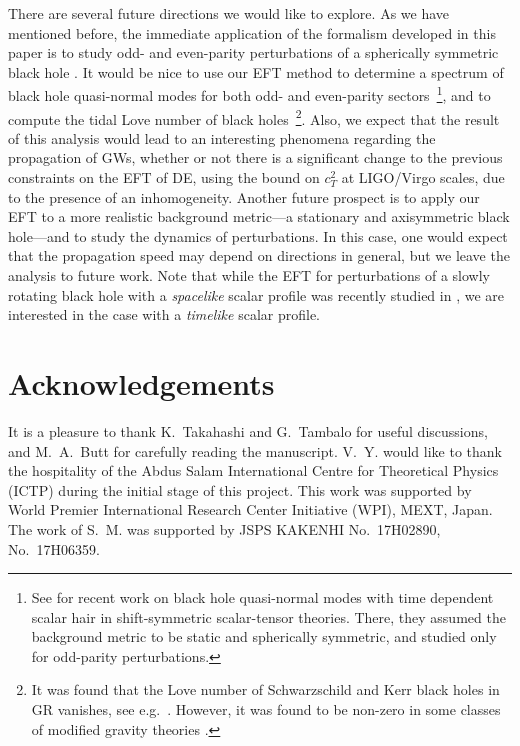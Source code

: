\documentclass[a4paper,11pt]{article}
\numberwithin{equation}{section}
\begin{document}
There are several future directions we would like to explore. As we have mentioned before, the immediate application of the formalism developed in this paper is to study odd- and even-parity perturbations of a spherically symmetric black hole \cite{Mukohyama:2022skv}. It would be nice to use our EFT method to determine a spectrum of black hole quasi-normal modes for both odd- and even-parity sectors~\footnote{See \cite{Tomikawa:2021pca} for recent work on black hole quasi-normal modes with time dependent scalar hair in shift-symmetric scalar-tensor theories. There, they assumed the background metric to be static and spherically symmetric, and studied only for odd-parity perturbations.}, and to compute the tidal Love number of black holes~\footnote{It was found that the Love number of Schwarzschild and Kerr black holes in GR vanishes, see e.g.~\cite{Hui:2020xxx,Charalambous:2021mea}. However, it was found to be non-zero in some classes of modified gravity theories \cite{Cardoso:2018ptl,Bernard:2019yfz}.}. Also, we expect that the result of this analysis would lead to an interesting phenomena regarding the propagation of GWs, whether or not there is a significant change to the previous constraints on the EFT of DE, using the bound on $c_T^2$ at LIGO/Virgo scales, due to the presence of an inhomogeneity. Another future prospect is to apply our EFT to a more realistic background metric---a stationary and axisymmetric black hole---and to study the dynamics of perturbations. In this case, one would expect that the propagation speed may depend on directions in general, but we leave the analysis to future work. Note that while the EFT for perturbations of a slowly rotating black hole with a \textit{spacelike} scalar profile was recently studied in \cite{Hui:2021cpm}, we are interested in the case with a \textit{timelike} scalar profile. 


\section*{Acknowledgements}
It is a pleasure to thank K.~Takahashi and G.~Tambalo for useful discussions, and M.~A.~Butt for carefully reading the manuscript. V.~Y. would like to thank the hospitality of the Abdus Salam International Centre for Theoretical Physics (ICTP) during the initial stage of this project. This work was supported by World Premier International Research Center Initiative (WPI), MEXT, Japan.
The work of S.~M. was supported by JSPS KAKENHI No.\ 17H02890, No.\ 17H06359. 
\end{document}
